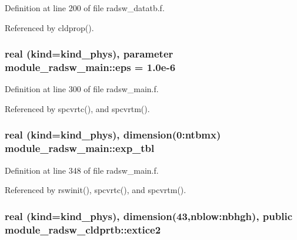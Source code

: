 Definition at line 200 of file radsw\+\_\+datatb.\+f.



Referenced by cldprop().

\subsubsection[{\texorpdfstring{eps}{eps}}]{\setlength{\rightskip}{0pt plus 5cm}real (kind=kind\+\_\+phys), parameter module\+\_\+radsw\+\_\+main\+::eps = 1.\+0e-\/6\hspace{0.3cm}{\ttfamily [private]}}\hypertarget{group__module__radsw__main_ga7d311ceb7f824ea31d31ba8144751b5a}{}\label{group__module__radsw__main_ga7d311ceb7f824ea31d31ba8144751b5a}


Definition at line 300 of file radsw\+\_\+main.\+f.



Referenced by spcvrtc(), and spcvrtm().

\subsubsection[{\texorpdfstring{exp\+\_\+tbl}{exp_tbl}}]{\setlength{\rightskip}{0pt plus 5cm}real (kind=kind\+\_\+phys), dimension(0\+:ntbmx) module\+\_\+radsw\+\_\+main\+::exp\+\_\+tbl\hspace{0.3cm}{\ttfamily [private]}}\hypertarget{group__module__radsw__main_ga1f9d18b17cc24321ed1cf45254ac2b0f}{}\label{group__module__radsw__main_ga1f9d18b17cc24321ed1cf45254ac2b0f}


Definition at line 348 of file radsw\+\_\+main.\+f.



Referenced by rswinit(), spcvrtc(), and spcvrtm().

\subsubsection[{\texorpdfstring{extice2}{extice2}}]{\setlength{\rightskip}{0pt plus 5cm}real (kind=kind\+\_\+phys), dimension(43,nblow\+:nbhgh), public module\+\_\+radsw\+\_\+cldprtb\+::extice2}\hypertarget{group__module__radsw__main_ga8ed403302034ea073243157749673e14}{}\label{group__module__radsw__main_ga8ed403302034ea073243157749673e14}


